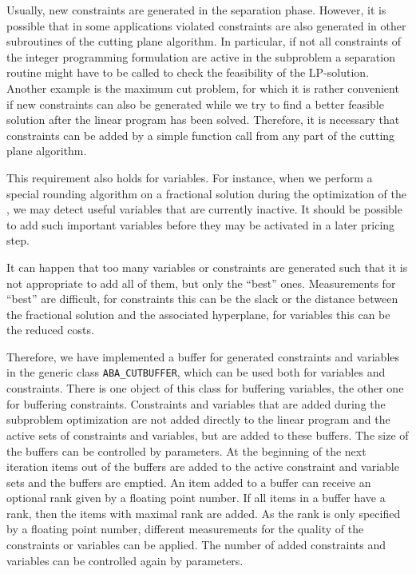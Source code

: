 Usually, new constraints are generated in the separation phase. However,
it is possible that in some applications violated constraints are
also generated in other subroutines of the cutting plane algorithm.
In particular, if not all constraints of the integer programming formulation
are active in the subproblem
a separation routine might have to be called to check
the feasibility of the LP-solution.
Another example is the maximum cut problem, for which it is rather 
convenient if
new constraints can also be generated while we try to find a better
feasible solution after the linear program has been solved.
Therefore, it is necessary that constraints can be added by a simple
function call from any part of the cutting plane algorithm.

This requirement also holds for variables. For instance, when we perform
a special rounding algorithm on a fractional solution during the
optimization of the \tsp, we may detect useful variables that are
currently inactive. It should be possible to add such important variables
before they may be activated in a later pricing step.

It can happen that too many variables or constraints are generated
such that it is not appropriate to add all of them, but only the ``best''
ones. Measurements for ``best'' are difficult, for constraints this
can be the slack or the distance between the fractional solution and
the associated hyperplane, for variables this can be the reduced costs.

Therefore, we have implemented a buffer for generated constraints and
variables in the generic class {\tt ABA\_CUTBUFFER}, 
which can be used
both for variables and constraints. There is one object of this
class for buffering variables, the other one for buffering constraints.
Constraints and variables that are added during the subproblem optimization
are not added directly to the linear program and
the active sets of constraints and variables, but are added
to these buffers. The size of the buffers can be controlled by
parameters. At the beginning of the next iteration items 
out of the buffers are added
to the active constraint and variable sets and the buffers are emptied.
An item added to a buffer can receive an optional rank given by a floating
point number. If all items in a buffer have a rank, then the items 
with maximal rank are added. As the rank is only specified by a floating
point number, different measurements for the quality of the constraints
or variables can be applied.
The number of added constraints and
variables can be controlled again by parameters.

